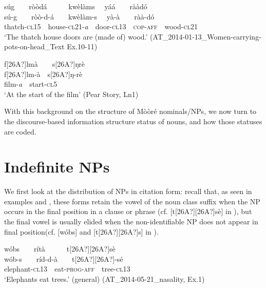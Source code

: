 \documentclass[output=paper]{langsci/langscibook}
\begin{document}
\ea\label{ex:teo:24}
\label{bkm:Ref264213880}súg\ \ \ \ ròòdá\ \ \ \ \ \ kwèlàms \ \ yá\'{a}\ \ \ \ rààdó\\
\gll sú\nobreakdash-g\ \ \ \ ròò\nobreakdash-d\nobreakdash-á\ \ \ \ kwèlàm\nobreakdash-s \ \ y\`{a}-\`{a}\ \ \ \ ràà\nobreakdash-dó\\
thatch\nobreakdash-\textsc{cl15}\ \ house-\textsc{cl21\nobreakdash-}\textit{a}\textsc{\ \ }door\nobreakdash-\textsc{cl13}\ \ \textsc{cop-aff}\ \ wood\nobreakdash-\textsc{cl21}\\
\glt ‘The thatch house doors are (made of) wood.’ (AT\_2014-01-13\_Women-carrying-pots-on-head\_Text Ex.10-11)
\z

\ea\label{ex:teo:25}
\label{bkm:Ref264213889}f[26A?]lm\`{a}\ \ \ \ s[26A?]ŋr\`{e}\\
\gll f[26A?]lm\nobreakdash-\`{a}\ \ s[26A?]ŋ\nobreakdash-r\`{e}\\
film\nobreakdash-\textit{a}\textsc{\ \ }start\nobreakdash-\textsc{cl5}\\
\glt ‘At the start of the film’ (Pear Story, Ln1)
\z

With this background on the structure of M\`{o}\`{o}r\'{e} nominals/NPs, we now turn to the discourse-based information structure status of nouns, and how those statuses are coded.

\section{Indefinite NPs}\label{sec:teo:5}

We first look at the distribution of NPs in citation form: recall that, as seen in examples  and , these forms retain the vowel of the noun class suffix when the NP occurs in the final position in a clause or phrase (cf. [t[26A?][26A?]sè] in ), but the final vowel is usually elided when the non-identifiable NP does not appear in final position(cf. [w\'{o}bs] and [t[26A?][26A?]s] in ).

\ea\label{ex:teo:26}
\label{bkm:Ref445382458}w\'{o}bs\ \ \ \ rítà\ \ \ \ \ \ t[26A?][26A?]sè\\
\gll w\'{o}b\nobreakdash-s\ \ \ \ ríd-d-à\ \ \ \ t[26A?][26A?]\nobreakdash-s\'{e}\\
elephant\nobreakdash-\textsc{cl13\ \ }eat\nobreakdash-\textsc{prog-aff}\ \ tree\nobreakdash-\textsc{cl13}\\
\glt ‘Elephants eat trees.’ (general) (AT\_2014-05-21\_nasality, Ex.1)
\z
\end{document}
